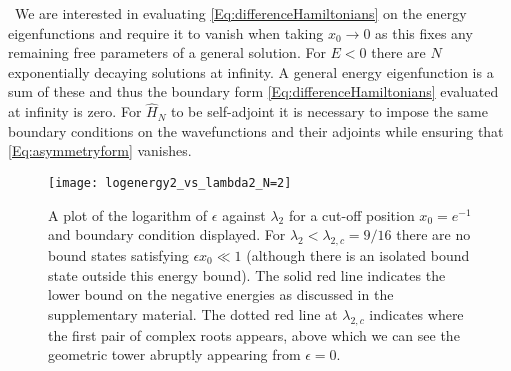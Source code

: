 \documentclass[aps,prl,reprint,preprintnumbers]{revtex4-1}
\begin{document}
{\ We are interested in evaluating \eqref{Eq:differenceHamiltonians} on the energy eigenfunctions and require it to vanish when taking $x_{0} \rightarrow 0$ as this fixes any remaining free parameters of a general solution. For $E<0$ there are $N$ exponentially decaying solutions at infinity. A general energy eigenfunction is a sum of these and thus the boundary form \eqref{Eq:differenceHamiltonians} evaluated at infinity is zero. For $\hat{H}_{N}$ to be self-adjoint it is necessary to impose the same boundary conditions on the wavefunctions and their adjoints while ensuring that \eqref{Eq:asymmetryform} vanishes.}

\begin{figure}[!t]
  \centering
  \texttt{[image: logenergy2\_vs\_lambda2\_N=2]}
  \caption{A plot of the logarithm of $\epsilon$ against $\lambda_{2}$ for a cut-off position $x_{0} = e^{-1}$ and boundary condition displayed. For $\lambda_{2}<\lambda_{2,c}=9/16$ there are no bound states satisfying $\epsilon x_{0} \ll 1$ (although there is an isolated bound state outside this energy bound). The solid red line indicates the lower bound on the negative energies as discussed in the supplementary material. The dotted red line at $\lambda_{2,c}$ indicates where the first pair of complex roots appears, above which we can see the geometric tower abruptly appearing from $\epsilon=0$.}
  \label{fig:N=4cutoff}
  \vspace{-1em}
\end{figure}
\end{document}
